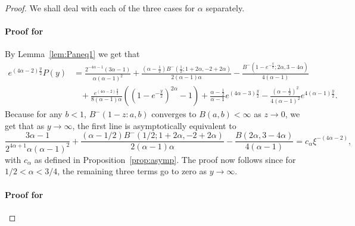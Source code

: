 \begin{proof}
We shall deal with each of the three cases for $\alpha$ separately.

\paragraph{Proof for }
By Lemma~\ref{lem:Paneq1} we get that
\begin{align*}
	e^{(4\alpha - 2)\frac{y}{2}}P(y) &= \frac{2^{-4 \alpha-1} (3 \alpha - 1)}{\alpha (\alpha - 1)^2} 
		+ \frac{(\alpha - \frac{1}{2} ) B^-(\frac{1}{2}; 1 + 2 \alpha, -2 + 2 \alpha)}{2(\alpha - 1) \alpha}
		- \frac{B^-(1-e^{-\frac{y}{2}}; 2\alpha, 3-4\alpha)}{4(\alpha - 1)} \\
	&\hspace{10pt}+ \frac{e^{(4\alpha - 2)\frac{y}{2}}}{8(\alpha-1)\alpha}\left((1 - e^{-\frac{y}{2}})^{2\alpha} - 1\right)
		+ \frac{\alpha-\frac{1}{2}}{\alpha-1} e^{(4\alpha-3)\frac{y}{2}}
		- \frac{(\alpha - \frac{1}{2})^2}{4(\alpha-1)^2} e^{4(\alpha-1)\frac{y}{2}}.
\end{align*}
Because for any $b < 1$, $B^-(1-z: a,b)$ converges to $B(a,b) < \infty$ as $z \to 0$, we get that as $y \to \infty$, the first line is asymptotically equivalent to
\[
	\frac{3 \alpha - 1}{2^{4 \alpha+1} \alpha (\alpha - 1)^2} 
			+ \frac{(\alpha - 1/2 ) B^-(1/2; 1 + 2 \alpha, -2 + 2 \alpha)}{2(\alpha - 1) \alpha}
			- \frac{B(2\alpha, 3-4\alpha)}{4(\alpha - 1)} = c_\alpha \xi^{-(4\alpha - 2)},
\]
with $c_\alpha$ as defined in Proposition~\eqref{prop:asymp}. The proof now follows since for $1/2 < \alpha < 3/4$, the remaining three terms go to zero as $y \to \infty$.

\paragraph{Proof for }


\end{proof}
